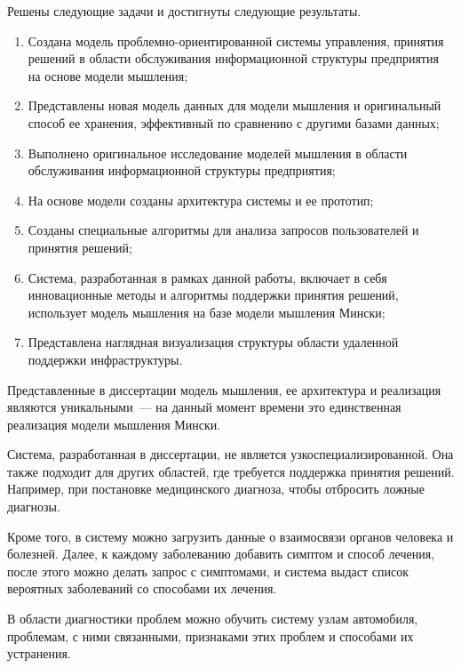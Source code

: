 
Решены следующие задачи и достигнуты следующие результаты.
\begin{enumerate}
  \item Создана модель проблемно-ориентированной системы управления, принятия решений в области обслуживания информационной структуры предприятия на основе модели мышления;
  \item Представлены новая модель данных для модели мышления и оригинальный способ ее хранения, эффективный по сравнению с другими базами данных;
  \item Выполнено оригинальное исследование моделей мышления в области обслуживания информационной структуры предприятия;
  \item На основе модели созданы архитектура системы и ее прототип; 
  \item Созданы специальные алгоритмы для анализа запросов пользователей и принятия решений;
  \item Система, разработанная в рамках данной работы, включает в себя инновационные методы и алгоритмы поддержки принятия решений, использует модель мышления на базе модели мышления Мински;
  \item Представлена наглядная визуализация структуры области удаленной поддержки инфраструктуры.
\end{enumerate}

Представленные в диссертации модель мышления, ее архитектура и реализация являются уникальными~--- на данный момент времени это единственная реализация модели мышления Мински. \par
Система, разработанная в диссертации, не является узкоспециализированной. Она также подходит для других областей, где требуется поддержка принятия решений. Например, при постановке медицинского диагноза, чтобы отбросить ложные диагнозы. \par
Кроме того, в систему можно загрузить данные о взаимосвязи органов человека и болезней. Далее, к каждому заболеванию добавить симптом и способ лечения, после этого можно делать запрос с симптомами, и система выдаст список вероятных заболеваний со способами их лечения. \par
В области диагностики проблем можно обучить систему узлам автомобиля, проблемам, с ними связанными, признаками этих проблем и способами их устранения. 



